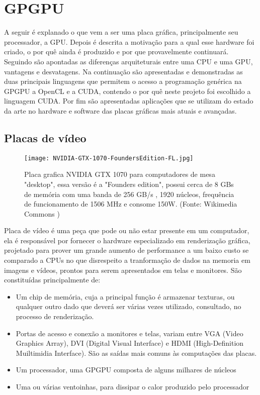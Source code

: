 \chapter{GPGPU}
\label{cap:gpgpu}

A seguir é explanado o que vem a ser uma placa gráfica, principalmente seu processador, a GPU. Depois é descrita a motivação para a qual esse hardware foi criado, o por quê ainda é produzido e por que provavelmente continuará. Seguindo são apontadas as diferenças arquiteturais entre uma CPU e uma GPU, vantagens e desvatagens. Na continuação são apresentadas e demonstradas as duas principais linguagens que permitem o acesso a programação genérica na GPGPU a OpenCL e a CUDA, contendo o por quê neste projeto foi escolhido a linguagem CUDA. Por fim são apresentadas aplicações que se utilizam do estado da arte no hardware e software das placas gráficas mais atuais e avançadas.

\section{Placas de vídeo}
  \begin{figure}[!h]
    \centering
    \texttt{[image: NVIDIA-GTX-1070-FoundersEdition-FL.jpg]}
    \caption{Placa grafica NVIDIA GTX 1070 para computadores de mesa "desktop", essa versão é a "Founders edition", possui cerca de 8 GBs de memória com uma banda de 256 GB/s , 1920 núcleos, frequência de funcionamento de 1506 MHz e consome 150W. (Fonte: Wikimedia Commons \protect\footnotemark)}
    \label{fig:gtx1070}
  \end{figure}


  Placa de vídeo é uma peça que pode ou não estar presente em um computador, ela é responsável por fornecer o hardware especializado em renderização gráfica, projetado para prover um grande aumento de performance a um baixo custo se comparado a CPUs no que disrespeito a tranformação de dados na memoria em imagens e vídeos, prontos para serem apresentados em telas e monitores. São constituídas principalmente de:
  \begin{itemize}
    \item Um chip de memória, cuja a principal função é armazenar texturas, ou qualquer outro dado que deverá ser várias vezes utilizado, consultado, no processo de renderização.
    \item Portas de acesso e conexão a monitores e telas, variam entre VGA (Video Graphics Array), DVI (Digital Visual Interface) e HDMI (High-Definition Muiltimidia Interface). São as saídas mais comuns às computações das placas.
    \item Um processador, uma GPGPU composta de alguns milhares de núcleos
    \item Uma ou várias ventoinhas, para dissipar o calor produzido pelo processador
  \end{itemize}

